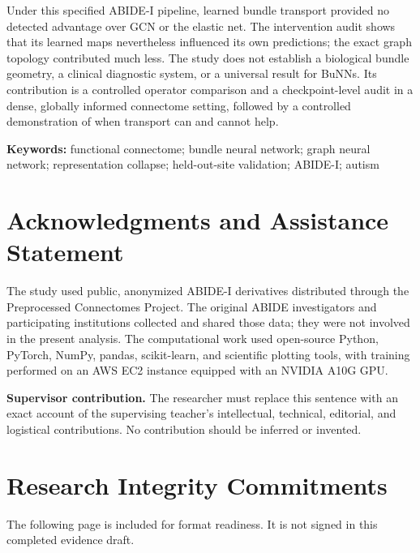 \documentclass[11pt,a4paper]{article}
\begin{document}
Under this specified ABIDE-I pipeline, learned bundle transport provided no
detected advantage over GCN or the elastic net. The intervention audit shows
that its learned maps nevertheless influenced its own predictions; the exact
graph topology contributed much less. The study does not establish a
biological bundle geometry, a clinical diagnostic system, or a universal
result for BuNNs. Its contribution is a controlled operator comparison and a
checkpoint-level audit in a dense, globally informed connectome setting,
followed by a controlled demonstration of when transport can and cannot help.

\noindent\textbf{Keywords:} functional connectome; bundle neural network;
graph neural network; representation collapse; held-out-site validation;
ABIDE-I; autism

\clearpage
\section*{Acknowledgments and Assistance Statement}

The study used public, anonymized ABIDE-I derivatives distributed through the
Preprocessed Connectomes Project. The original ABIDE investigators and
participating institutions collected and shared those data; they were not
involved in the present analysis. The computational work used open-source
Python, PyTorch, NumPy, pandas, scikit-learn, and scientific plotting tools,
with training performed on an AWS EC2 instance equipped with an NVIDIA A10G
GPU.

\noindent\textbf{Supervisor contribution.} The researcher must replace this
sentence with an exact account of the supervising teacher's intellectual,
technical, editorial, and logistical contributions. No contribution should be
inferred or invented.

\clearpage
\section*{Research Integrity Commitments}

The following page is included for format readiness. It is not signed in this
completed evidence draft.
\end{document}

